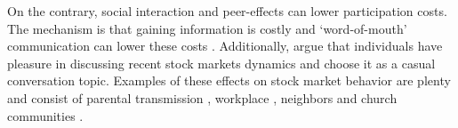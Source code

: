 \documentclass[ProjectABM]{subfiles}
\begin{document}
On the contrary, social interaction and peer-effects can lower participation costs. %
The mechanism is that gaining information is costly and `word-of-mouth' communication can lower these costs \citep{brown_2008}. Additionally, \cite{hong_et_al_2004social} argue that individuals have pleasure in discussing recent stock markets dynamics and choose it as a casual conversation topic. Examples of these effects on stock market behavior are plenty and consist of parental transmission \citep{CS2000_parental}, workplace \citep{duflo_saez2002_workplace}, neighbors and church communities \citep{hong_et_al_2004social, brown_2008}.





\end{document}

